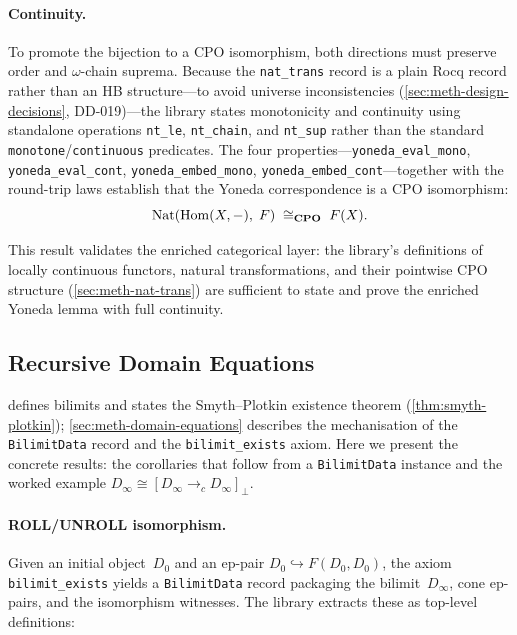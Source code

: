 \paragraph{Continuity.}
To promote the bijection to a CPO isomorphism, both directions must
preserve order and $\omega$-chain suprema.  Because the
\texttt{nat\_trans} record is a plain Rocq record rather than an HB
structure---to avoid universe inconsistencies
(\cref{sec:meth-design-decisions}, DD-019)---the library states
monotonicity and continuity using standalone operations
\texttt{nt\_le}, \texttt{nt\_chain}, and \texttt{nt\_sup} rather than
the standard \texttt{monotone}/\texttt{continuous} predicates.
The four properties---\texttt{yoneda\_eval\_mono},
\texttt{yoneda\_eval\_cont}, \texttt{yoneda\_embed\_mono},
\texttt{yoneda\_embed\_cont}---together with the round-trip laws
establish that the Yoneda correspondence is a CPO isomorphism:
\[
  \mathrm{Nat}(\mathrm{Hom}(X,-),\; F)
    \;\cong_{\mathbf{CPO}}\;
  F(X).
\]

This result validates the enriched categorical layer: the library's
definitions of locally continuous functors, natural transformations,
and their pointwise CPO structure (\cref{sec:meth-nat-trans}) are
sufficient to state and prove the enriched Yoneda lemma with full
continuity.

\subsection{Recursive Domain Equations}
\label{sec:res-domain-equations}


 defines bilimits and states the
Smyth--Plotkin existence theorem (\cref{thm:smyth-plotkin});
\cref{sec:meth-domain-equations} describes the mechanisation of the
\texttt{BilimitData} record and the \texttt{bilimit\_exists} axiom.
Here we present the concrete results: the corollaries that follow from
a \texttt{BilimitData} instance and the worked example
$D_\infty \cong [D_\infty \to_c D_\infty]_\bot$.

\paragraph{ROLL/UNROLL isomorphism.}
Given an initial object~$D_0$ and an ep-pair
$D_0 \hookrightarrow F(D_0, D_0)$, the axiom
\texttt{bilimit\_exists} yields a \texttt{BilimitData} record packaging
the bilimit~$D_\infty$, cone ep-pairs, and the isomorphism
witnesses.  The library extracts these as top-level definitions:

